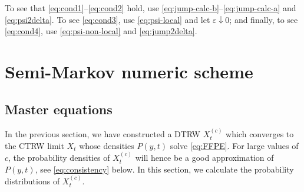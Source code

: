 \documentclass[a4paper,12pt]{elsarticle}
\numberwithin{equation}{section}
\theoremstyle{plain}
\theoremstyle{definition}
\theoremstyle{remark}
\numberwithin{equation}{section}
\newcommand{\1}{\mathbf 1}
\begin{document}
To see that \eqref{eq:cond1}--\eqref{eq:cond2} hold, use 
\eqref{eq:jump-calc-b}--\eqref{eq:jump-calc-a} and \eqref{eq:psi2delta}. To see \eqref{eq:cond3}, use \eqref{eq:psi-local} and let $\varepsilon \downarrow 0$; and finally, to see \eqref{eq:cond4}, use \eqref{eq:psi-non-local} and \eqref{eq:jump2delta}.





\section{Semi-Markov numeric scheme}

\subsection{Master equations}

In the previous section, we have constructed a DTRW $X^{(c)}_t$ which  converges to the CTRW limit $X_t$ whose densities $P(y,t)$ solve \eqref{eq:FFPE}.  For large values of $c$, the probability densities of $X^{(c)}_t$ will hence be a good approximation of $P(y,t)$, see \eqref{eq:consistency} below.  
In this section, we calculate the probability distributions of $X^{(c)}_t$. 
\end{document}
